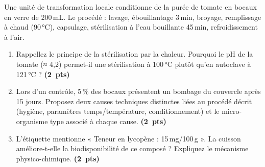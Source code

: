 \documentclass[11pt]{article}
\begin{document}
\begin{exercice}
Une unité de transformation locale conditionne de la purée de tomate en bocaux en verre de 200\,mL. Le procédé : lavage, ébouillantage 3\,min, broyage, remplissage à chaud (90\,°C), capsulage, stérilisation à l'eau bouillante 45\,min, refroidissement à l'air.
\begin{enumerate}
    \item Rappellez le principe de la stérilisation par la chaleur. Pourquoi le pH de la tomate (≈ 4,2) permet-il une stérilisation à 100\,°C plutôt qu'en autoclave à 121\,°C ? \hfill\textbf{(2~pts)}
    \item Lors d'un contrôle, 5\,\% des bocaux présentent un bombage du couvercle après 15 jours. Proposez deux causes techniques distinctes liées au procédé décrit (hygiène, paramètres temps/température, conditionnement) et le micro-organisme type associé à chaque cause. \hfill\textbf{(2~pts)}
    \item L'étiquette mentionne « Teneur en lycopène : 15\,mg/100\,g ». La cuisson améliore-t-elle la biodisponibilité de ce composé ? Expliquez le mécanisme physico-chimique. \hfill\textbf{(2~pts)}
\end{enumerate}
\end{exercice}
\end{document}
